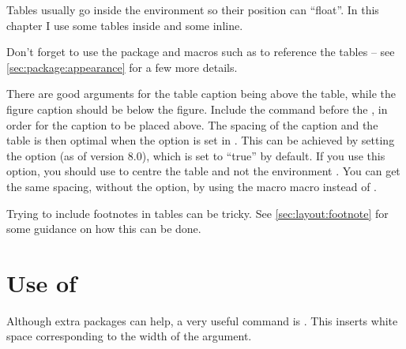 Tables usually go inside the  environment so their position can \enquote{float}.
In this chapter I use some tables inside  and some inline.

Don't forget to use the package  and macros such as 
to reference the tables -- see \cref{sec:package:appearance} for a few more details.

There are good arguments for the table caption being above the table,
while the figure caption should be below the figure.
Include the  command before the ,
in order for the caption to be placed above.
The spacing of the caption and the table is then optimal
when the option 
is set in \KOMAScript.
This can be achieved by setting the option  (as of version 8.0), which is set to \enquote{true} by default.
If you use this option, you should use  to centre the table
and not the environment .
You can get the same spacing, without the  option,
by using the macro  macro instead of .

Trying to include footnotes in tables can be tricky.
See \cref{sec:layout:footnote} for some guidance on how this can be done.


\section{Use of \texorpdfstring{}{phantom}}%
\label{sec:table:phantom}

Although extra packages can help, a very useful command is
. This inserts white space corresponding to the width
of the argument. 

